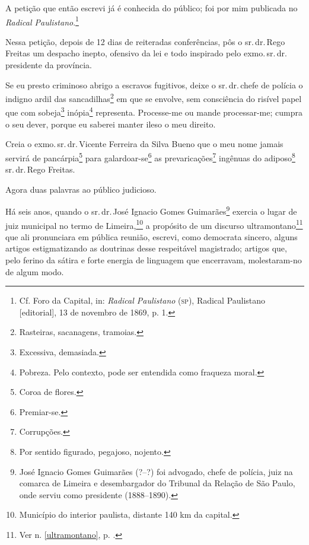 A petição que então escrevi já é conhecida do público; foi por mim
publicada no \emph{Radical Paulistano}.\footnote{Cf. Foro da Capital, in: \emph{Radical Paulistano} (\textsc{sp}), Radical Paulistano {[}editorial{]}, 13 de novembro de 1869, p. 1.}

Nessa petição, depois de 12 dias de reiteradas conferências, pôs o sr.\,dr.\,Rego Freitas um despacho inepto, ofensivo da lei e todo inspirado
pelo exmo.\,sr.\,dr.\,presidente da província.

Se eu presto criminoso abrigo a escravos fugitivos, deixe o sr.\,dr.\,chefe de polícia o indigno ardil das sancadilhas\footnote{Rasteiras,
  sacanagens, tramoias.} em que se envolve, sem consciência do risível
papel que com sobeja\footnote{Excessiva, demasiada.} inópia\footnote{
  Pobreza. Pelo contexto, pode ser entendida como fraqueza moral.}
representa. Processe-me ou mande processar-me; cumpra o seu dever,
porque eu saberei manter ileso o meu direito.

Creia o exmo.\,sr.\,dr.\,Vicente Ferreira da Silva Bueno que o meu nome
jamais servirá de pancárpia\footnote{Coroa de flores.} para
galardoar-se\footnote{Premiar-se.} as prevaricações\footnote{
  Corrupções.} ingênuas do adiposo\footnote{Por sentido figurado,
  pegajoso, nojento.} sr.\,dr.\,Rego Freitas.

Agora duas palavras ao público judicioso.

Há seis anos, quando o sr.\,dr.\,José Ignacio Gomes Guimarães\footnote{
  José Ignacio Gomes Guimarães (?--?) foi advogado, chefe de polícia,
  juiz na comarca de Limeira e desembargador do Tribunal da Relação de
  São Paulo, onde serviu como presidente (1888--1890).} exercia o lugar
de juiz municipal no termo de Limeira,\footnote{Município do interior
  paulista, distante 140 km da capital.} a propósito de um discurso
ultramontano\footnote{Ver n. \ref{ultramontano}, p. 
\pageref{ultramontano}.} que ali
pronunciara em pública reunião, escrevi, como democrata sincero, alguns
artigos estigmatizando as doutrinas desse respeitável magistrado;
artigos que, pelo ferino da sátira e forte energia de linguagem que
encerravam, molestaram-no de algum modo.

